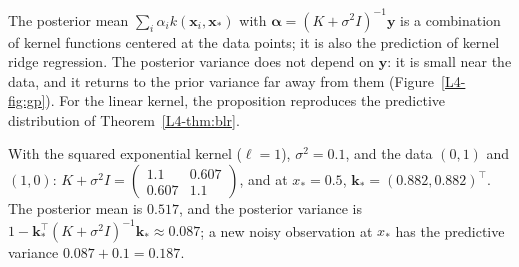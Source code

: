 The posterior mean $\sum_i \alpha_i k(\mathbf{x}_i, \mathbf{x}_*)$ with $\boldsymbol{\alpha} = (K + \sigma^2 I)^{-1}\mathbf{y}$ is a combination of kernel functions centered at the data points; it is also the prediction of kernel ridge regression. The posterior variance does not depend on $\mathbf{y}$: it is small near the data, and it returns to the prior variance far away from them (Figure~\ref{L4-fig:gp}). For the linear kernel, the proposition reproduces the predictive distribution of Theorem~\ref{L4-thm:blr}.

\begin{example}\label{L4-ex:gp}
    With the squared exponential kernel ($\ell = 1$), $\sigma^2 = 0.1$, and the data $(0, 1)$ and $(1, 0)$: $K + \sigma^2 I = \begin{pmatrix} 1.1 & 0.607 \\ 0.607 & 1.1 \end{pmatrix}$, and at $x_* = 0.5$, $\mathbf{k}_* = (0.882, 0.882)^\top$. The posterior mean is $0.517$, and the posterior variance is $1 - \mathbf{k}_*^\top(K + \sigma^2 I)^{-1}\mathbf{k}_* \approx 0.087$; a new noisy observation at $x_*$ has the predictive variance $0.087 + 0.1 = 0.187$.
\end{example}

